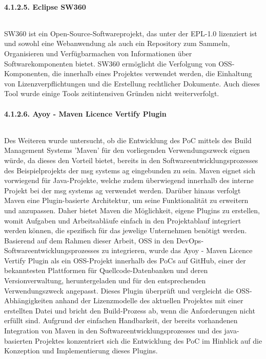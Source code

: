 \paragraph{4.1.2.5. Eclipse SW360} $~$

SW360 ist ein Open-Source-Softwareprojekt, das unter der EPL-1.0 lizenziert ist und sowohl eine Webanwendung als auch ein Repository zum Sammeln, Organisieren und Verfügbarmachen von Informationen über Softwarekomponenten bietet. \cite{the_eclipse_foundation_sw360_2018} SW360 ermöglicht die Verfolgung von OSS-Komponenten, die innerhalb eines Projektes verwendet werden, die Einhaltung von Lizenzverpflichtungen und die Erstellung rechtlicher Dokumente. Auch dieses Tool wurde einige Tools zeitintensiven Gründen nicht weiterverfolgt.   

\paragraph{4.1.2.6. Ayoy - Maven Licence Vertify Plugin} $~$

Des Weiteren wurde untersucht, ob die Entwicklung des PoC mittels des Build Management Systems 'Maven' für den vorliegenden Verwendungszweck eignen würde, da dieses den Vorteil bietet, bereits in den Softwareentwicklungsprozesses des Beispielprojekts der msg systems ag eingebunden zu sein. Maven eignet sich vorwiegend für Java-Projekte, welche zudem überwiegend innerhalb des interne Projekt bei der msg systems ag verwendet werden. Darüber hinaus verfolgt Maven eine Plugin-basierte Architektur, um seine Funktionalität zu erweitern und anzupassen. \cite[S. 28]{spiller_maven_2011} Daher bietet Maven die Möglichkeit, eigene Plugins zu erstellen, womit Aufgaben und Arbeitsabläufe einfach in den Projektablauf integriert werden können, die spezifisch für das jewelige Unternehmen benötigt werden. \cite[S. 3]{varanasi_introducing_2019} Basierend auf dem Rahmen dieser Arbeit, OSS in den DevOps-Softwareentwicklungsprozesses zu integrieren, wurde das Ayoy - Maven Licence Vertify Plugin \cite{allberg_ayoyabayoy-maven-license-verifier-plugin_2021} als ein OSS-Projekt innerhalb des PoCs auf GitHub, einer der bekanntesten Plattformen für Quellcode-Datenbanken und deren Versionverwaltung, heruntergeladen und für den entsprechenden Verwendungszweck angepasst. Dieses Plugin überprüft und vergleicht die OSS-Abhängigkeiten anhand der Lizenzmodelle des aktuellen Projektes mit einer erstellten Datei und bricht den Build-Prozess ab, wenn die Anforderungen nicht erfüllt sind. Aufgrund der einfachen Handbarkeit, der bereits vorhandenen Integration von Maven in den Softwareentwicklungsprozesses und des java-basierten Projektes konzentriert sich die Entwicklung des PoC im Hinblick auf die Konzeption und Implementierung dieses Plugins. 


